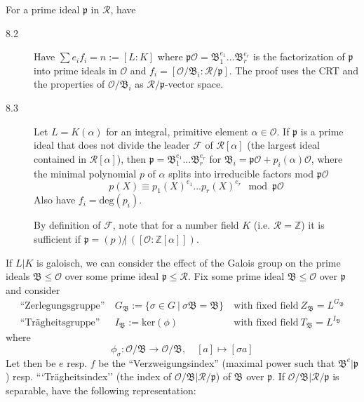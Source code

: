 \documentclass{scrartcl}
\newcommand{\Z}{\mathbb{Z}}
\begin{document}
For a prime ideal $\mathfrak{p}$ in $\mathcal{R}$, have
\begin{description}
    \item[8.2] Have $\sum e_i f_i = n := [L : K]$ where $\mathfrak{p}\mathcal{O} = \mathfrak{B}_1^{e_1}...\mathfrak{B}_r^{e_r}$ is the factorization of $\mathfrak{p}$ into prime ideals in $\mathcal{O}$ and $f_i = [\mathcal{O}/\mathfrak{B}_i : \mathcal{R}/\mathfrak{p}]$. The proof uses the CRT and the properties of $\mathcal{O}/\mathfrak{B}_i$ as $\mathcal{R}/\mathfrak{p}$-vector space.
    \item[8.3] Let $L = K(\alpha)$ for an integral, primitive element $\alpha \in \mathcal{O}$. If $\mathfrak{p}$ is a prime ideal that does not divide the leader $\mathcal{F}$ of $\mathcal{R}[\alpha]$ (the largest ideal contained in $\mathcal{R}[\alpha]$), then $\mathfrak{p} = \mathfrak{B}_1^{e_1}...\mathfrak{B}_r^{e_r}$ for $\mathfrak{B}_i = \mathfrak{p}\mathcal{O} + p_i(\alpha)\mathcal{O}$, where the minimal polynomial $p$ of $\alpha$ splits into irreducible factors mod $\mathfrak{p}\mathcal{O}$ 
    \begin{equation}
        p(X) \equiv p_1(X)^{e_1} ... p_r(X)^{e_r} \mod \mathfrak{p}\mathcal{O} \nonumber
    \end{equation} 
    Also have $f_i = \mathrm{deg}(p_i)$.

    By definition of $\mathcal{F}$, note that for a number field $K$ (i.e. $\mathcal{R} = \Z$) it is sufficient if $\mathfrak{p} = (p) \not| \ ([\mathcal{O} : \Z[\alpha]])$.
\end{description}
If $L|K$ is galoisch, we can consider the effect of the Galois group on the prime ideals $\mathfrak{B} \leq \mathcal{O}$ over some prime ideal $\mathfrak{p} \leq \mathcal{R}$.
Fix some prime ideal $\mathfrak{B} \leq \mathcal{O}$ over $\mathfrak{p}$ and consider
\begin{align*}
    \text{``Zerlegungsgruppe''} \ &G_{\mathfrak{B}} := \{ \sigma \in G \ | \ \sigma \mathfrak{B} = \mathfrak{B} \} \ &\text{with fixed field} \ Z_{\mathfrak{B}} = L^{G_\mathfrak{B}} \\
    \text{``Trägheitsgruppe''} \ &I_{\mathfrak{B}} := \mathrm{ker}(\phi) \ &\text{with fixed field} \ T_\mathfrak{B} = L^{I_\mathfrak{B}}
\end{align*}
where
\begin{equation*}
    \phi_\sigma: \mathcal{O}/\mathfrak{B} \to \mathcal{O}/\mathfrak{B}, \quad [a] \mapsto [\sigma a]
\end{equation*}
Let then be $e$ resp. $f$ be the ``Verzweigungsindex'' (maximal power such that $\mathfrak{B}^e | \mathfrak{p}$) resp. ```Trägheitsindex'' (the index of $\mathcal{O}/\mathfrak{B} | \mathcal{R}/\mathfrak{p}$) of $\mathfrak{B}$ over $\mathfrak{p}$. If $\mathcal{O}/\mathfrak{B} | \mathcal{R}/\mathfrak{p}$ is separable, have the following representation:
\end{document}
